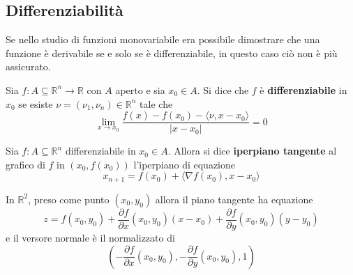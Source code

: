 \subsection{Differenziabilità}
Se nello studio di funzioni monovariabile era possibile dimostrare che una funzione è derivabile se e solo se è differenziabile, in questo caso ciò non è più assicurato.
\begin{definition} \label{Def: Differenziabilità}
    Sia $f:A \subseteq \mathbb{R}^n \to \mathbb{R}$ con $A$ aperto e sia $x_0 \in A$. Si dice che $f$ è \textbf{differenziabile} in $x_0$ se esiste $\nu=(\nu_1, \nu_n) \in \mathbb{R}^n$ tale che
    \begin{equation}
        \lim_{x \to x_0}{\frac{f(x)-f(x_0)-\langle \nu, x-x_0\rangle}{|x-x_0|}}=0
    \end{equation}
\end{definition}
\begin{definition} {\label{Def: Piano tangente}}
    Sia $f:A \subseteq \mathbb{R}^n$ differenziabile in $x_0 \in A$. Allora si dice \textbf{iperpiano tangente} al grafico di $f$ in $(x_0, f(x_0))$ l'iperpiano di equazione
    \begin{equation}
        x_{n+1}= f(x_0)+ \langle \nabla f(x_0), x-x_0 \rangle
    \end{equation}
 \begin{oss}
    In $\mathbb{R}^2$, preso come punto $(x_0, y_0)$ allora il piano tangente ha equazione
    \begin{equation}
        z=f(x_0, y_0)+ \frac{\partial f }{\partial x}{(x_0, y_0)}(x-x_0) +\frac{\partial f }{\partial y}{(x_0, y_0)}(y-y_0) 
    \end{equation}
    e il versore normale è il normalizzato di
    \begin{equation}
        \left(-\frac{\partial f}{\partial x}{(x_0, y_0)}, -\frac{\partial f}{\partial y}{(x_0, y_0)},1\right)
    \end{equation}
 \end{oss}
\end{definition}
